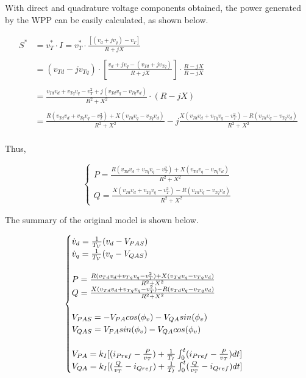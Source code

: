 With direct and quadrature voltage components obtained, the power generated by the WPP can be easily calculated, as shown below.

\begin{align*}
		S^{*} &= v_{T}^{*} \cdot I = v_{T}^{*} \cdot \frac{[(v_{d} + jv_{q}) - v_{T}]}{R + jX} \\
		\\
		&= (v_{Td} - jv_{Tq})\cdot\left[\frac{v_{d} + jv_{q} - (v_{Td} + jv_{Tq})}{R + jX}\right]\cdot \frac{R - jX}{R - jX} \\
		\\
		&= \frac{v_{Td}v_{d} + v_{Tq}v_{q} - v_{T}^{2} + j(v_{Td}v_{q} - v_{Tq}v_{d})}{R^{2} + X^{2}}\cdot (R - jX) \\
		\\
		&= \frac{R(v_{Td}v_{d} + v_{Tq}v_{q} - v_{T}^{2}) + X(v_{Td}v_{q} - v_{Tq}v_{d})}{R^{2} + X^{2}} - j\frac{X(v_{Td}v_{d} + v_{Tq}v_{q} - v_{T}^{2}) - R(v_{Td}v_{q} - v_{Tq}v_{d})}{R^{2} + X^{2}} \\
\end{align*}

Thus,

\begin{equation}
	\begin{cases}
		P = \frac{R(v_{Td}v_{d} + v_{Tq}v_{q} - v_{T}^{2}) + X(v_{Td}v_{q} - v_{Tq}v_{d})}{R^{2} + X^{2}} \\
		Q = \frac{X(v_{Td}v_{d} + v_{Tq}v_{q} - v_{T}^{2}) - R(v_{Td}v_{q} - v_{Tq}v_{d})}{R^{2} + X^{2}}
	\end{cases}
	\label{eq: Outputs}
\end{equation}

The summary of the original model is shown below.

\begin{equation}
	\begin{cases}
		\dot{v}_{d} = \frac{1}{T_{V}}(v_{d} - V_{PAS}) \\
		\dot{v}_{q} = \frac{1}{T_{V}}(v_{q} - V_{QAS}) \\
		\\
		P = \frac{R(v_{Td}v_{d} + v_{Tq}v_{q} - v_{T}^{2}) + X(v_{Td}v_{q} - v_{Tq}v_{d})}{R^{2} + X^{2}} \\
		Q = \frac{X(v_{Td}v_{d} + v_{Tq}v_{q} - v_{T}^{2}) - R(v_{Td}v_{q} - v_{Tq}v_{d})}{R^{2} + X^{2}} \\
		\\
		V_{PAS} = -V_{PA}cos(\phi_{v}) - V_{QA}sin(\phi_{v}) \\
		V_{QAS} = V_{PA}sin(\phi_{v}) - V_{QA}cos(\phi_{v}) \\
		\\
		V_{PA} = k_{I}[(i_{Pref} - \frac{P}{v_{T}}) + \frac{1}{T_{I}}\int\displaylimits_{0}^{t} (i_{Pref} - \frac{P}{v_{T}})dt]\\
		V_{QA} = k_{I}[(\frac{Q}{v_{T}} - i_{Qref}) + \frac{1}{T_{I}}\int\displaylimits_{0}^{t} (\frac{Q}{v_{T}} - i_{Qref})dt]
	\end{cases}
	\label{eq: summary_original}
\end{equation}

